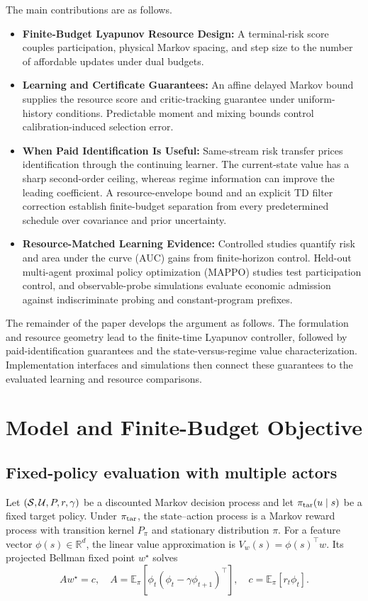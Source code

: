 \documentclass[journal]{IEEEtran}
\newcommand{\E}{\mathbb{E}}
\newcommand{\R}{\mathbb{R}}
\begin{document}
The main contributions are as follows.
\begin{itemize}
\item \textbf{Finite-Budget Lyapunov Resource Design:} A terminal-risk score couples participation, physical Markov spacing, and step size to the number of affordable updates under dual budgets.
\item \textbf{Learning and Certificate Guarantees:} An affine delayed Markov bound supplies the resource score and critic-tracking guarantee under uniform-history conditions.
Predictable moment and mixing bounds control calibration-induced selection error.
\item \textbf{When Paid Identification Is Useful:} Same-stream risk transfer prices identification through the continuing learner.
The current-state value has a sharp second-order ceiling, whereas regime information can improve the leading coefficient.
A resource-envelope bound and an explicit TD filter correction establish finite-budget separation from every predetermined schedule over covariance and prior uncertainty.
\item \textbf{Resource-Matched Learning Evidence:} Controlled studies quantify risk and area under the curve (AUC) gains from finite-horizon control.
Held-out multi-agent proximal policy optimization (MAPPO) studies test participation control, and observable-probe simulations evaluate economic admission against indiscriminate probing and constant-program prefixes.
\end{itemize}

The remainder of the paper develops the argument as follows.
The formulation and resource geometry lead to the finite-time Lyapunov controller, followed by paid-identification guarantees and the state-versus-regime value characterization.
Implementation interfaces and simulations then connect these guarantees to the evaluated learning and resource comparisons.

\section{Model and Finite-Budget Objective}
\subsection{Fixed-policy evaluation with multiple actors}
Let $({\cal S},{\cal U},P,r,\gamma)$ be a discounted Markov decision process and let $\pi_{\rm tar}(u\mid s)$ be a fixed target policy.
Under $\pi_{\rm tar}$, the state--action process is a Markov reward process with transition kernel $P_{\pi}$ and stationary distribution $\pi$.
For a feature vector $\phi(s)\in\R^d$, the linear value approximation is $V_w(s)=\phi(s)^\top w$.
Its projected Bellman fixed point $w^\star$ solves
\begin{equation}
A w^\star=c,
\quad
A=\E_\pi[\phi_t(\phi_t-\gamma\phi_{t+1})^\top],
\quad
c=\E_\pi[r_t\phi_t].
\label{eq:projected-fixed-point}
\end{equation}
\end{document}
